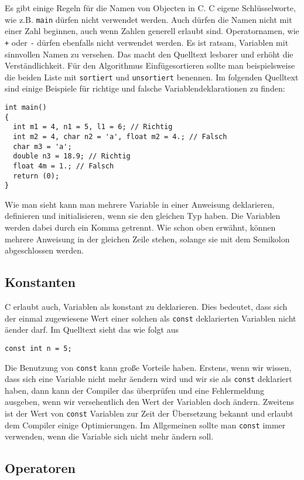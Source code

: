 Es gibt einige Regeln für die Namen von Objecten in C. 
C eigene Schlüsselworte, wie z.B. \texttt{main} dürfen nicht verwendet werden.
Auch dürfen die Namen nicht mit einer Zahl beginnen, auch wenn Zahlen generell erlaubt sind.
Operatornamen, wie \verb|+| oder \verb|-| dürfen ebenfalls nicht verwendet werden.
Es ist ratsam, Variablen mit sinnvollen Namen zu versehen.
Das macht den Quelltext lesbarer und erhöht die Verständlichkeit.
Für den Algorithmus Einfügesortieren sollte man beispielsweise die beiden Liste mit \texttt{sortiert} und \texttt{unsortiert} benennen.
Im folgenden Quelltext sind einige Beispiele für richtige und falsche Variablendeklarationen zu finden:
\begin{lstlisting}
int main()
{
  int m1 = 4, n1 = 5, l1 = 6; // Richtig
  int m2 = 4, char n2 = 'a', float m2 = 4.; // Falsch
  char m3 = 'a';
  double n3 = 18.9; // Richtig
  float 4m = 1.; // Falsch
  return (0);
}
\end{lstlisting} 
Wie man sieht kann man mehrere Variable in einer Anweisung deklarieren, definieren und initialisieren, wenn sie den gleichen Typ haben.
Die Variablen werden dabei durch ein Komma getrennt.
Wie schon oben erwähnt, können mehrere Anweisung in der gleichen Zeile stehen, solange sie mit dem Semikolon abgeschlossen werden.

\subsection{Konstanten}

C erlaubt auch, Variablen als konstant zu deklarieren. 
Dies bedeutet, dass sich der einmal zugewiesene Wert einer solchen als \verb|const| deklarierten Variablen nicht äender darf.
Im Quelltext sieht das wie folgt aus
\begin{lstlisting}
const int n = 5;
\end{lstlisting}
Die Benutzung von \verb|const| kann große Vorteile haben.
Erstens, wenn wir wissen, dass sich eine Variable nicht mehr äendern wird und wir sie als  \verb|const| deklariert haben, dann kann der Compiler das überprüfen und eine Fehlermeldung ausgeben, wenn wir versehentlich den Wert der Variablen doch ändern.
Zweitens ist der Wert von \verb|const| Variablen zur Zeit der Übersetzung bekannt und erlaubt dem Compiler einige Optimierungen.
Im Allgemeinen sollte man \verb|const| immer verwenden, wenn die Variable sich nicht mehr ändern soll.

\subsection{Operatoren}

